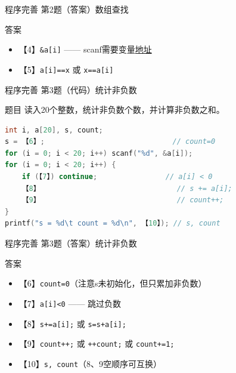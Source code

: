 \begin{frame}{程序完善 第2题（答案）}{数组查找}
    \begin{alertblock}{答案}
        \footnotesize
        \begin{itemize}
            \setlength{\itemsep}{0pt}
            \item 【4】\texttt{\&a[i]} —— scanf需要变量\underline{地址}
            \item 【5】\texttt{a[i]==x} 或 \texttt{x==a[i]}
        \end{itemize}
    \end{alertblock}
\end{frame}

\begin{frame}[fragile]{程序完善 第3题（代码）}{统计非负数}
    \begin{exampleblock}{题目}
        读入20个整数，统计非负数个数，并计算非负数之和。
    \end{exampleblock}
    \begin{lstlisting}[language=C, basicstyle=\scriptsize\ttfamily]
int i, a[20], s, count;
s = 【6】;                              // count=0
for (i = 0; i < 20; i++) scanf("%d", &a[i]);
for (i = 0; i < 20; i++) {
    if (【7】) continue;                // a[i] < 0
    【8】                                // s += a[i];
    【9】                                // count++;
}
printf("s = %d\t count = %d\n", 【10】); // s, count
\end{lstlisting}
\end{frame}

\begin{frame}{程序完善 第3题（答案）}{统计非负数}
    \begin{alertblock}{答案}
        \footnotesize
        \begin{itemize}
            \setlength{\itemsep}{0pt}
            \item 【6】\texttt{count=0}（注意s未初始化，但只累加非负数）
            \item 【7】\texttt{a[i]<0} —— 跳过负数
            \item 【8】\texttt{s+=a[i];} 或 \texttt{s=s+a[i];}
            \item 【9】\texttt{count++;} 或 \texttt{++count;} 或 \texttt{count+=1;}
            \item 【10】\texttt{s, count}（8、9空顺序可互换）
        \end{itemize}
    \end{alertblock}
\end{frame}
